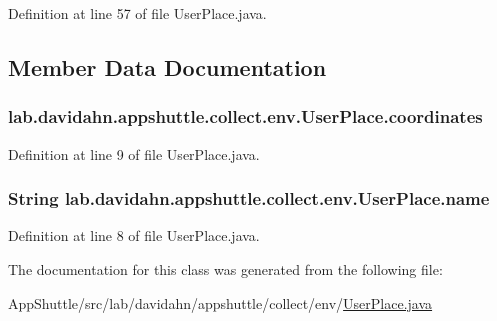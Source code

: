 \-Definition at line 57 of file \-User\-Place.\-java.



\subsection{\-Member \-Data \-Documentation}
\hypertarget{classlab_1_1davidahn_1_1appshuttle_1_1collect_1_1env_1_1_user_place_a8f16ba4d6dd464e972a5abc34f2f6a00}{
\subsubsection[{coordinates}]{ {\bf lab.\-davidahn.\-appshuttle.\-collect.\-env.\-User\-Place.\-coordinates}}}\label{classlab_1_1davidahn_1_1appshuttle_1_1collect_1_1env_1_1_user_place_a8f16ba4d6dd464e972a5abc34f2f6a00}


\-Definition at line 9 of file \-User\-Place.\-java.

\hypertarget{classlab_1_1davidahn_1_1appshuttle_1_1collect_1_1env_1_1_user_place_a6d2970fca5b2e10d26daa0e550b583b1}{
\subsubsection[{name}]{\setlength{\rightskip}{0pt plus 5cm}\-String {\bf lab.\-davidahn.\-appshuttle.\-collect.\-env.\-User\-Place.\-name}}}\label{classlab_1_1davidahn_1_1appshuttle_1_1collect_1_1env_1_1_user_place_a6d2970fca5b2e10d26daa0e550b583b1}


\-Definition at line 8 of file \-User\-Place.\-java.



\-The documentation for this class was generated from the following file\-:\begin{DoxyCompactItemize}
\item 
\-App\-Shuttle/src/lab/davidahn/appshuttle/collect/env/\hyperlink{_user_place_8java}{\-User\-Place.\-java}\end{DoxyCompactItemize}
